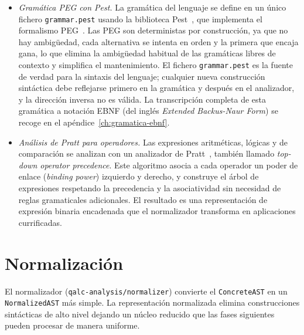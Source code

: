\begin{itemize}
  \item \textit{Gramática PEG con Pest.} La gramática del lenguaje se define en un único fichero \lstinline|grammar.pest| usando la biblioteca Pest~\cite{pest_parser}, que implementa el formalismo PEG~\cite{ford_peg_2004}. Las PEG son deterministas por construcción, ya que no hay ambigüedad, cada alternativa se intenta en orden y la primera que encaja gana, lo que elimina la ambigüedad habitual de las gramáticas libres de contexto y simplifica el mantenimiento. El fichero \lstinline|grammar.pest| es la fuente de verdad para la sintaxis del lenguaje; cualquier nueva construcción sintáctica debe reflejarse primero en la gramática y después en el analizador, y la dirección inversa no es válida. La transcripción completa de esta gramática a notación EBNF (del inglés \textit{Extended Backus-Naur Form}) se recoge en el apéndice~\ref{ch:gramatica-ebnf}.

  \item \textit{Análisis de Pratt para operadores.} Las expresiones aritméticas, lógicas y de comparación se analizan con un analizador de Pratt~\cite{pratt_1973}, también llamado \textit{top-down operator precedence}. Este algoritmo asocia a cada operador un poder de enlace (\textit{binding power}) izquierdo y derecho, y construye el árbol de expresiones respetando la precedencia y la asociatividad sin necesidad de reglas gramaticales adicionales. El resultado es una representación de expresión binaria encadenada que el normalizador transforma en aplicaciones currificadas.
\end{itemize}

\section{Normalización}
\label{sec:normalizador}

El normalizador (\lstinline|qalc-analysis/normalizer|) convierte el \lstinline|ConcreteAST| en un \lstinline|NormalizedAST| más simple. La representación normalizada elimina construcciones sintácticas de alto nivel dejando un núcleo reducido que las fases siguientes pueden procesar de manera uniforme.

